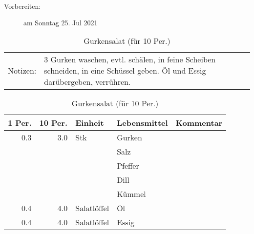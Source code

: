 \documentclass[11pt,a4paper]{article}%
\begin{document}
%
\begin{description}%
\item[Vorbereiten:]%
am Sonntag 25. Jul 2021%
\end{description}%
\vspace{0.75cm}%
\renewcommand{\arraystretch}{1.25}%


\begin{table}[h]%
\caption{Gurkensalat (für 10 Per.)}%
\begin{tabularx}{\textwidth}{l X}%
Notizen:&3 Gurken waschen, evtl. schälen, in feine Scheiben schneiden, in eine Schüssel geben.\newline%
Öl und Essig darübergeben, verrühren.\newline%
\\%
\end{tabularx}%
\par%
\begin{tabularx}{\textwidth}{| r | r | l | l | X |}%
\hline%
\tiny{1 Per.}&\tiny{10 Per.}&\tiny{Einheit}&\tiny{Lebensmittel}&\tiny{Kommentar}\\%
\hline%
0.3&3.0&Stk&Gurken&\\%
\hline%
&&&Salz&\\%
\hline%
&&&Pfeffer&\\%
\hline%
&&&Dill&\\%
\hline%
&&&Kümmel&\\%
\hline%
0.4&4.0&Salatlöffel&Öl&\\%
\hline%
0.4&4.0&Salatlöffel&Essig&\\%
\hline%
\end{tabularx}%
\end{table}

%
\vspace{0.75cm}%
\renewcommand{\arraystretch}{1.25}%
\end{document}
